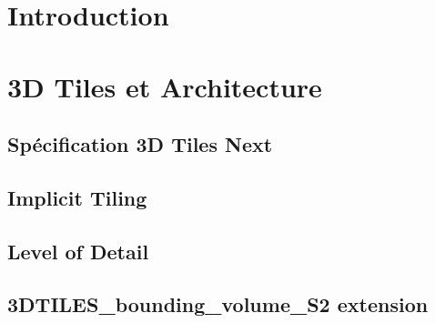 \documentclass[
    TIC, %
    il, %
]{heig-tb}
\begin{document}
\maketitle
\frontmatter
\clearemptydoublepage

\preamble
\authentification

\begin{abstract}
    
\end{abstract}

\clearemptydoublepage
{
    \tableofcontents
    \let\cleardoublepage\clearpage
    \listoffigures
    \let\cleardoublepage\clearpage
}

\printnomenclature
\clearemptydoublepage
{}

\mainmatter


\chapter{Introduction}


\chapter{3D Tiles et Architecture}

\section{Spécification 3D Tiles Next}
\label{sec:3d-tiles-next}


\newpage
\section{Implicit Tiling}
\label{sec:implicit-tiling}


\newpage
\section{Level of Detail}
\label{sec:lod}


\newpage
\section{3DTILES\_bounding\_volume\_S2 extension}
\label{sec:3DTILES_bv_S2}

\end{document}
